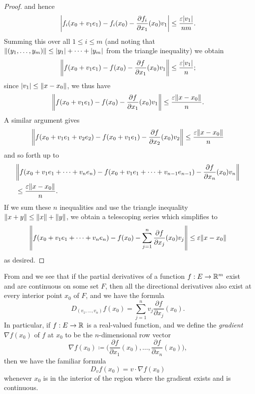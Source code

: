 \begin{proof}
  and hence
  \[
    \abs{f_i(x_0 + v_1 e_1) - f_i(x_0) - \dfrac{\partial f_i}{\partial x_1}(x_0) v_1} \leq \dfrac{\varepsilon \abs{v_1}}{nm}.
  \]
  Summing this over all \(1 \leq i \leq m\) (and noting that \(\norm*{(y_1, \dots, y_m)} \leq \abs{y_1} + \dots + \abs{y_m}\) from the triangle inequality) we obtain
  \[
    \norm*{f(x_0 + v_1 e_1) - f(x_0) - \dfrac{\partial f}{\partial x_1}(x_0) v_1} \leq \dfrac{\varepsilon \abs{v_1}}{n};
  \]
  since \(\abs{v_1} \leq \norm*{x - x_0}\), we thus have
  \[
    \norm*{f(x_0 + v_1 e_1) - f(x_0) - \dfrac{\partial f}{\partial x_1}(x_0) v_1} \leq \dfrac{\varepsilon \norm*{x - x_0}}{n}.
  \]
  A similar argument gives
  \[
    \norm*{f(x_0 + v_1 e_1 + v_2 e_2) - f(x_0 + v_1 e_1) - \dfrac{\partial f}{\partial x_2}(x_0) v_2} \leq \dfrac{\varepsilon \norm*{x - x_0}}{n}
  \]
  and so forth up to
  \begin{align*}
     & \norm*{f(x_0 + v_1 e_1 + \dots + v_n e_n) - f(x_0 + v_1 e_1 + \dots + v_{n - 1} e_{n - 1}) - \dfrac{\partial f}{\partial x_n}(x_0) v_n} \\
     & \leq \dfrac{\varepsilon \norm*{x - x_0}}{n}.
  \end{align*}
  If we sum these \(n\) inequalities and use the triangle inequality \(\norm*{x + y} \leq \norm*{x} + \norm*{y}\), we obtain a telescoping series which simplifies to
  \[
    \norm*{f(x_0 + v_1 e_1 + \dots + v_n e_n) - f(x_0) - \sum_{j = 1}^n \dfrac{\partial f}{\partial x_j}(x_0) v_j} \leq \varepsilon \norm*{x - x_0}
  \]
  as desired.
\end{proof}

\begin{ac}\label{ii:ac:6.3.3}
  From  and  we see that if the partial derivatives of a function \(f : E \to \R^m\) exist and are continuous on some set \(F\), then all the directional derivatives also exist at every interior point \(x_0\) of \(F\), and we have the formula
  \[
    D_{(v_1, \dots, v_n)} f(x_0) = \sum_{j = 1}^n v_j \dfrac{\partial f}{\partial x_j}(x_0).
  \]
  In particular, if \(f : E \to \R\) is a real-valued function, and we define the \emph{gradient} \(\nabla f(x_0)\) of \(f\) at \(x_0\) to be the \(n\)-dimensional row vector
  \[
    \nabla f(x_0) \coloneqq \bigg(\dfrac{\partial f}{\partial x_1}(x_0), \dots, \dfrac{\partial f}{\partial x_n}(x_0)\bigg),
  \]
  then we have the familiar formula
  \[
    D_v f(x_0) = v \cdot \nabla f(x_0)
  \]
  whenever \(x_0\) is in the interior of the region where the gradient exists and is continuous.
\end{ac}

